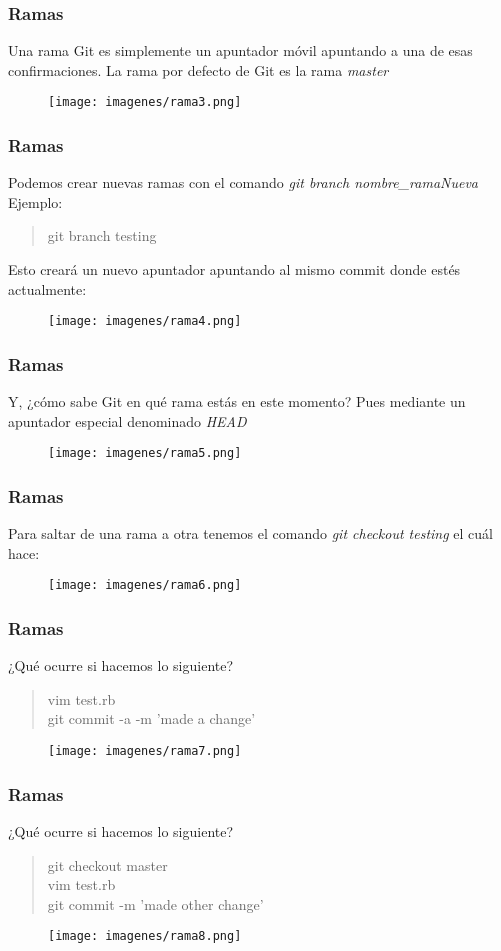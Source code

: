 \documentclass{beamer}
\begin{document}
\begin{frame}
\frametitle{Ramas}
Una rama Git es simplemente un apuntador móvil apuntando a una de esas confirmaciones. La rama por defecto de Git es la rama \emph{master}
\begin{figure}
\texttt{[image: imagenes/rama3.png]}
\end{figure}
\end{frame}

\begin{frame}
\frametitle{Ramas}
Podemos crear nuevas ramas con el comando \emph{git branch nombre\_ramaNueva}\\
\pause
Ejemplo:
\begin{verse}
git branch testing
\end{verse}
\pause
Esto creará un nuevo apuntador apuntando al mismo commit donde estés actualmente:
\begin{figure}
\texttt{[image: imagenes/rama4.png]}
\end{figure}
\end{frame}

\begin{frame}
\frametitle{Ramas}
Y, ¿cómo sabe Git en qué rama estás en este momento? Pues mediante un apuntador especial denominado \emph{HEAD}
\begin{figure}
\texttt{[image: imagenes/rama5.png]}
\end{figure}
\end{frame}

\begin{frame}
\frametitle{Ramas}
Para saltar de una rama a otra tenemos el comando \emph{git checkout testing} el cuál hace:
\begin{figure}
\texttt{[image: imagenes/rama6.png]}
\end{figure}
\end{frame}

\begin{frame}
\frametitle{Ramas}
¿Qué ocurre si hacemos lo siguiente?
\begin{verse}
vim test.rb\\
git commit -a -m 'made a change'
\end{verse}
\begin{figure}
\texttt{[image: imagenes/rama7.png]}
\end{figure}
\end{frame}

\begin{frame}
\frametitle{Ramas}
¿Qué ocurre si hacemos lo siguiente?
\begin{verse}
git checkout master\\
vim test.rb\\
git commit -m 'made other change'
\end{verse}
\begin{figure}
\texttt{[image: imagenes/rama8.png]}
\end{figure}
\end{frame}
\end{document}
